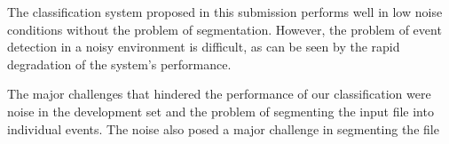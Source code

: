 The classification system proposed in this submission performs well in low noise conditions without the problem of segmentation. However, the problem of event detection in a noisy environment is difficult, as can be seen by the rapid degradation of the system's performance.

The major challenges that hindered the performance of our classification were noise in the development set and the problem of segmenting the input file into individual events. The noise also posed a major challenge in segmenting the file


